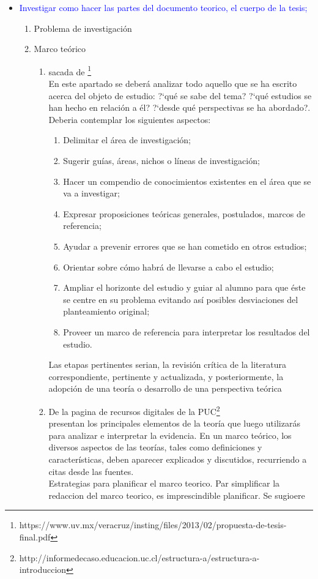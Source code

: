 \documentclass[a4paper,14pt]{article}
\begin{document}
\begin{itemize}
\item \textcolor{blue}{Investigar como hacer las partes del documento teorico, el cuerpo de la tesis;}
\begin{enumerate}
\item Problema de investigación
\item Marco teórico
\begin{enumerate}
\item sacada de \footnote{https://www.uv.mx/veracruz/insting/files/2013/02/propuesta-de-tesis-final.pdf}\\
En este apartado se deberá analizar todo aquello que se ha escrito acerca del objeto de estudio: ?`qué se sabe del tema? ?`qué estudios se han hecho en relación a él? ?`desde qué perspectivas se ha abordado?.\\
Deberia contemplar los siguientes aspectos:
\begin{enumerate}
\item Delimitar el área de investigación;
\item Sugerir guías, áreas, nichos o líneas de investigación;
\item Hacer un compendio de conocimientos existentes en el área que se va a investigar;
\item Expresar proposiciones teóricas generales, postulados, marcos de referencia;
\item Ayudar a prevenir errores que se han cometido en otros estudios;
\item Orientar sobre cómo habrá de llevarse a cabo el estudio;
\item Ampliar el horizonte del estudio y guiar al alumno para que éste se centre en su problema evitando así posibles desviaciones del planteamiento original; \item Proveer un marco de referencia para interpretar los resultados del estudio.
\end{enumerate}
Las  etapas pertinentes serian,  la  revisión  crítica de la literatura correspondiente, pertinente y actualizada, y posteriormente, la adopción de una teoría o desarrollo de una perspectiva teórica
\item De la pagina de recursos digitales de la PUC\footnote{http://informedecaso.educacion.uc.cl/estructura-a/estructura-a-introduccion}\\
presentan los principales elementos de la teoría que luego utilizarás para analizar e interpretar la evidencia. En un marco teórico, los diversos aspectos de las teorías, tales como definiciones y características, deben aparecer explicados y discutidos, recurriendo a citas desde las fuentes.\\Estrategias para planificar el marco teorico. Par simplificar la redaccion del marco teorico, es imprescindible planificar. Se sugioere

\end{enumerate}
\end{enumerate}
\end{itemize}
\end{document}
